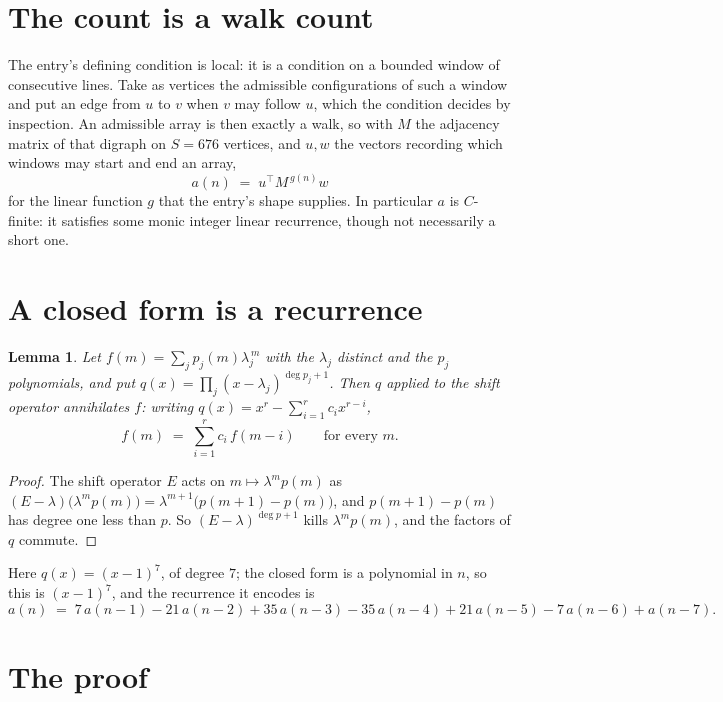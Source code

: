 \documentclass[11pt,a4paper]{article}
\theoremstyle{plain}
\newtheorem{lemma}[theorem]{Lemma}
\theoremstyle{definition}
\begin{document}
\section{The count is a walk count}

The entry's defining condition is local: it is a condition on a bounded window of consecutive lines. Take as vertices the
admissible configurations of such a window and put an edge from $u$ to $v$ when $v$ may
follow $u$, which the condition decides by inspection. An admissible array is then exactly a
walk, so with $M$ the adjacency matrix of that digraph on $S=676$ vertices, and $u,w$ the
vectors recording which windows may start and end an array,
\[
a(n)\;=\;u^{\!\top}M^{\,g(n)}w
\]
for the linear function $g$ that the entry's shape supplies. In particular $a$ is
$C$-finite: it satisfies some monic integer linear recurrence, though not necessarily a short
one.

\section{A closed form is a recurrence}

\begin{lemma}\label{lem:ann}
Let $f(m)=\sum_{j}p_j(m)\lambda_j^{\,m}$ with the $\lambda_j$ distinct and the $p_j$
polynomials, and put $q(x)=\prod_j(x-\lambda_j)^{\deg p_j+1}$. Then $q$ applied to the shift
operator annihilates $f$: writing $q(x)=x^{r}-\sum_{i=1}^{r}c_ix^{r-i}$,
\[
f(m)\;=\;\sum_{i=1}^{r}c_i\,f(m-i)\qquad\text{for every }m.
\]
\end{lemma}

\begin{proof}
The shift operator $E$ acts on $m\mapsto\lambda^{m}p(m)$ as
$(E-\lambda)\bigl(\lambda^{m}p(m)\bigr)=\lambda^{m+1}\bigl(p(m+1)-p(m)\bigr)$, and
$p(m+1)-p(m)$ has degree one less than $p$. So $(E-\lambda)^{\deg p+1}$ kills
$\lambda^{m}p(m)$, and the factors of $q$ commute.
\end{proof}

Here $q(x)=(x-1)^{7}$, of degree $7$; the closed form is a polynomial in $n$, so this is $(x-1)^{7}$, and the recurrence it encodes is
\begin{equation}\label{eq:rec}
a(n)\;=\;7\,a(n-1) - 21\,a(n-2) + 35\,a(n-3) - 35\,a(n-4) + 21\,a(n-5) - 7\,a(n-6) + a(n-7).
\end{equation}

\section{The proof}
\end{document}
